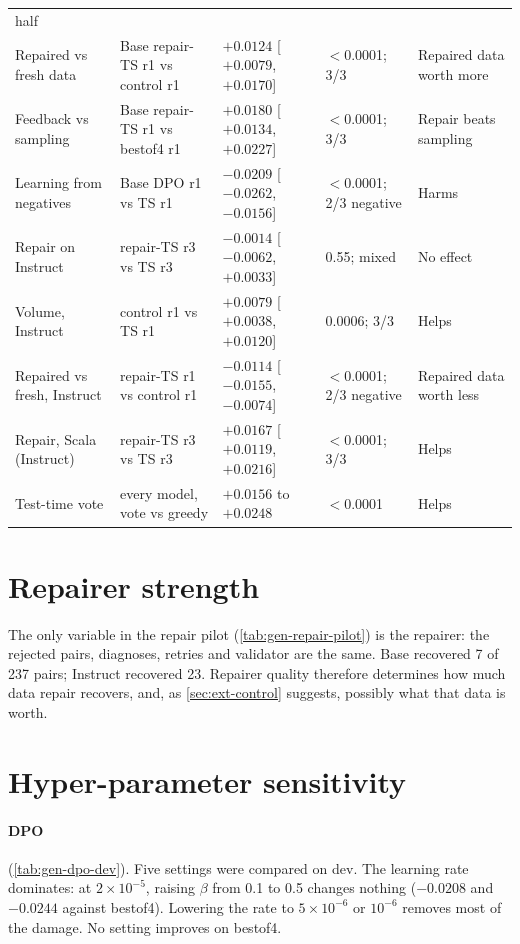 {\begin{longtable}{@{}p{3.3cm}p{3.6cm}p{2.5cm}p{2.7cm}p{2.5cm}@{}}
half\\
Repaired vs fresh data & Base repair-TS r1 vs control r1 & $+0.0124$ [$+0.0079$, $+0.0170$] & $<$0.0001; 3/3 &
Repaired data worth more\\
Feedback vs sampling & Base repair-TS r1 vs bestof4 r1 & $+0.0180$ [$+0.0134$, $+0.0227$] & $<$0.0001; 3/3 & Repair
beats sampling\\
Learning from negatives & Base DPO r1 vs TS r1 & $-0.0209$ [$-0.0262$, $-0.0156$] & $<$0.0001; 2/3 negative &
Harms\\
Repair on Instruct & repair-TS r3 vs TS r3 & $-0.0014$ [$-0.0062$, $+0.0033$] & 0.55; mixed & No effect\\
Volume, Instruct & control r1 vs TS r1 & $+0.0079$ [$+0.0038$, $+0.0120$] & 0.0006; 3/3 & Helps\\
Repaired vs fresh, Instruct & repair-TS r1 vs control r1 & $-0.0114$ [$-0.0155$, $-0.0074$] & $<$0.0001; 2/3 negative
& Repaired data worth less\\
Repair, Scala (Instruct) & repair-TS r3 vs TS r3 & $+0.0167$ [$+0.0119$, $+0.0216$] & $<$0.0001; 3/3 & Helps\\
Test-time vote & every model, vote vs greedy & $+0.0156$ to $+0.0248$ & $<$0.0001 & Helps\\
\end{longtable}
}

\section{Repairer strength}

The only variable in the repair pilot (\cref{tab:gen-repair-pilot}) is the repairer: the rejected pairs, diagnoses,
retries and validator are the same. Base recovered 7 of 237 pairs; Instruct recovered 23. Repairer quality therefore
determines how much data repair recovers, and, as \cref{sec:ext-control} suggests, possibly what that data is worth.

\section{Hyper-parameter sensitivity}

\paragraph{DPO} (\cref{tab:gen-dpo-dev}). Five settings were compared on dev. The learning rate dominates: at
$2\times10^{-5}$, raising $\beta$ from 0.1 to 0.5 changes nothing ($-0.0208$ and $-0.0244$ against bestof4). Lowering
the rate to $5\times10^{-6}$ or $10^{-6}$ removes most of the damage. No setting improves on bestof4.

